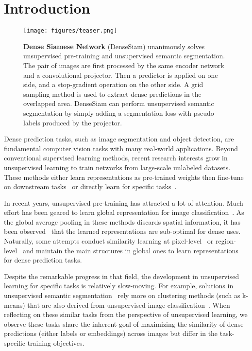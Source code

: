 \documentclass[runningheads]{llncs}
\begin{document}
 \section{Introduction}\label{sec:Introduction}

\begin{figure}[t]
	\centering
	\begin{minipage}{.44\linewidth}
		\texttt{[image: figures/teaser.png]}
\end{minipage}
	\begin{minipage}{.55\linewidth}
		\caption{\small{
		\textbf{Dense Siamese Network} (DenseSiam) unanimously solves unsupervised pre-training and unsupervised semantic segmentation.
		The pair of images are first processed by the same encoder network and a convolutional projector.
		Then a predictor is applied on one side, and a stop-gradient operation on the other side.
		A grid sampling method is used to extract dense predictions in the overlapped area.
		DenseSiam can perform unsupervised semantic segmentation by simply adding a segmentation loss with pseudo labels produced by the projector.
	}}\label{fig:teaser}
	\end{minipage}
\end{figure}

Dense prediction tasks, such as image segmentation and object detection, are fundamental computer vision tasks with many real-world applications.
Beyond conventional supervised learning methods, recent research interests grow in unsupervised learning to train networks from large-scale unlabeled datasets. 
These methods either learn representations as pre-trained weights then fine-tune on downstream tasks~\cite{insloc, simsiam}
or directly learn for specific tasks~\cite{picie}. 

In recent years, unsupervised pre-training has attracted a lot of attention.
Much effort has been geared to learn global representation for image classification~\cite{moco, swav, byol, simclr, simsiam}.
As the global average pooling in these methods discards spatial information, it has been observed~\cite{swav, byol, simclr, insloc} that the learned representations are sub-optimal for dense uses.
Naturally, some attempts conduct similarity learning at pixel-level~\cite{densecl, pixpro, vader} or region-level~\cite{scrl, resim, detcon, detco} and maintain the main structures in global ones to learn representations for dense prediction tasks.

Despite the remarkable progress in that field, the development in unsupervised learning for specific tasks is relatively slow-moving.
For example, solutions in unsupervised semantic segmentation~\cite{iic, picie, autoregressive} rely more on clustering methods (such as k-means) that are also derived from unsupervised image classification~\cite{iic, deepcluster, swav}. 
When reflecting on these similar tasks from the perspective of unsupervised learning, we observe these tasks share the inherent goal of maximizing the similarity of dense predictions (either labels or embeddings) across images but differ in the task-specific training objectives. 
\end{document}
